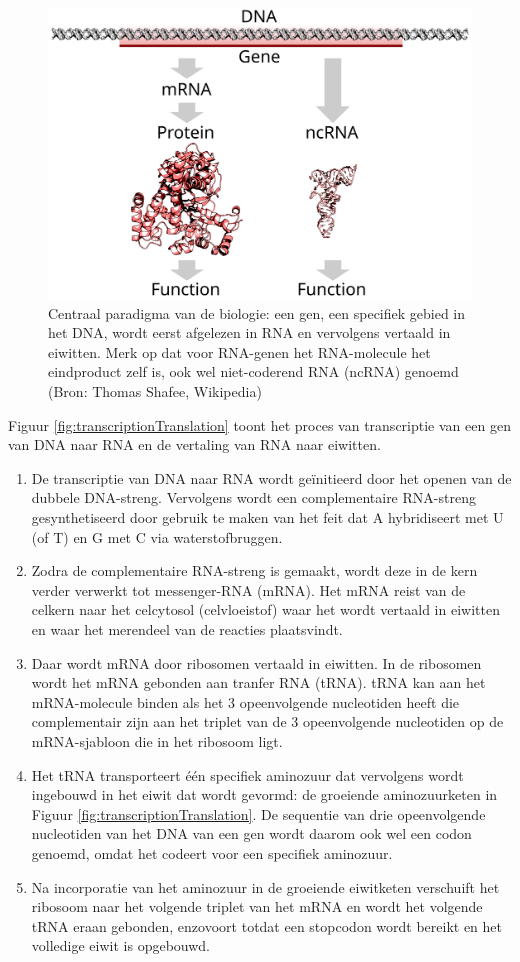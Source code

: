 \documentclass[
  11pt,
]{book}
\begin{document}
\begin{figure}

{\centering \includegraphics[width=0.5\linewidth]{./figs/gene} 

}

\caption{Centraal paradigma van de biologie: een gen, een specifiek gebied in het DNA, wordt eerst afgelezen in RNA en vervolgens vertaald in eiwitten. Merk op dat voor RNA-genen het RNA-molecule het eindproduct zelf is, ook wel niet-coderend RNA (ncRNA) genoemd (Bron:  Thomas Shafee, Wikipedia)}\label{fig:centralParadigm}
\end{figure}

Figuur \ref{fig:transcriptionTranslation} toont het proces van transcriptie van een gen van DNA naar RNA en de vertaling van RNA naar eiwitten.

\begin{enumerate}
\def\labelenumi{\arabic{enumi}.}
\item
  De transcriptie van DNA naar RNA wordt geïnitieerd door het openen van de dubbele DNA-streng. Vervolgens wordt een complementaire RNA-streng gesynthetiseerd door gebruik te maken van het feit dat A hybridiseert met U (of T) en G met C via waterstofbruggen.
\item
  Zodra de complementaire RNA-streng is gemaakt, wordt deze in de kern verder verwerkt tot messenger-RNA (mRNA). Het mRNA reist van de celkern naar het celcytosol (celvloeistof) waar het wordt vertaald in eiwitten en waar het merendeel van de reacties plaatsvindt.
\item
  Daar wordt mRNA door ribosomen vertaald in eiwitten. In de ribosomen wordt het mRNA gebonden aan tranfer RNA (tRNA). tRNA kan aan het mRNA-molecule binden als het 3 opeenvolgende nucleotiden heeft die complementair zijn aan het triplet van de 3 opeenvolgende nucleotiden op de mRNA-sjabloon die in het ribosoom ligt.
\item
  Het tRNA transporteert één specifiek aminozuur dat vervolgens wordt ingebouwd in het eiwit dat wordt gevormd: de groeiende aminozuurketen in Figuur \ref{fig:transcriptionTranslation}. De sequentie van drie opeenvolgende nucleotiden van het DNA van een gen wordt daarom ook wel een codon genoemd, omdat het codeert voor een specifiek aminozuur.
\item
  Na incorporatie van het aminozuur in de groeiende eiwitketen verschuift het ribosoom naar het volgende triplet van het mRNA en wordt het volgende tRNA eraan gebonden, enzovoort totdat een stopcodon wordt bereikt en het volledige eiwit is opgebouwd.
\end{enumerate}
\end{document}
